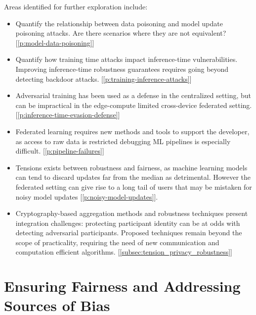 \documentclass[11pt]{article}
\begin{document}
Areas identified for further exploration include:

\begin{itemize}
  \item Quantify the relationship between data poisoning and model update poisoning attacks. Are there scenarios where they are not equivalent? [\ref{p:model-data-poisoning}]
  \item Quantify how training time attacks impact inference-time vulnerabilities. Improving inference-time robustness guarantees requires going beyond detecting backdoor attacks. [\ref{p:training-inference-attacks}]
  \item Adversarial training has been used as a defense in the centralized setting, but can be impractical in the edge-compute limited cross-device federated setting. [\ref{p:inference-time-evasion-defense}]
  \item Federated learning requires new methods and tools to support the developer, as access to raw data is restricted debugging ML pipelines is especially difficult. [\ref{p:pipeline-failures}]
  \item Tensions exists between robustness and fairness, as machine learning models can tend to discard updates far from the median as detrimental. However the federated setting can give rise to a long tail of users that may be mistaken for noisy model updates [\ref{p:noisy-model-updates}].  
  \item Cryptography-based aggregation methods and robustness techniques present integration challenges: protecting participant identity can be at odds with detecting adversarial participants. Proposed techniques remain beyond the scope of practicality, requiring the need of new communication and computation efficient algorithms. [\ref{subsec:tension_privacy_robustness}]
\end{itemize}

\pagebreak
\section{Ensuring Fairness and Addressing Sources of Bias} \label{sec:fairness}

\end{document}
